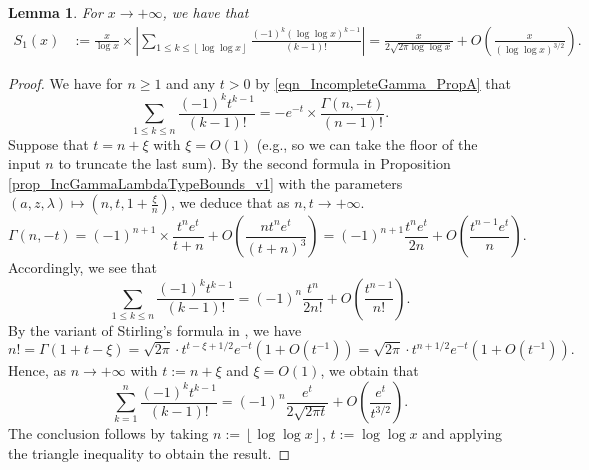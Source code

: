 \documentclass[11pt,reqno,a4letter]{article}
\numberwithin{figure}{section}
\numberwithin{table}{section}
\newcommand{\cf}{\textit{cf.\ }}
\newcommand{\floor}[1]{\left\lfloor #1 \right\rfloor}
\theoremstyle{plain}
\newtheorem{lemma}[theorem]{Lemma}
\numberwithin{theorem}{section}
\theoremstyle{definition}
\begin{document}
\begin{lemma}
\label{lemma_ConvenientIncGammaFuncTypePartialSumAsymptotics_v2}
For $x \rightarrow +\infty$, we have that 
\begin{align*}
S_1(x) & := \frac{x}{\log x} \times \left\lvert \sum_{1 \leq k \leq \floor{\log\log x}} 
     \frac{(-1)^k (\log\log x)^{k-1}}{(k-1)!} \right\rvert 
     = \frac{x}{2\sqrt{2\pi \log\log x}} + O\left(\frac{x}{(\log\log x)^{3/2}}\right). 
\end{align*}
\end{lemma}
\begin{proof}
We have for $n \geq 1$ and any $t > 0$ by 
\eqref{eqn_IncompleteGamma_PropA} that 
\[
\sum_{1 \leq k \leq n} \frac{(-1)^k t^{k-1}}{(k-1)!} = -e^{-t} \times 
     \frac{\Gamma(n, -t)}{(n-1)!}. 
\]
Suppose that $t = n + \xi$ with $\xi = O(1)$ (e.g., so we can take the floor of the input $n$ to 
truncate the last sum). By the second formula 
in Proposition \ref{prop_IncGammaLambdaTypeBounds_v1} 
with the parameters $(a, z, \lambda) \mapsto \left(n, t, 1 + \frac{\xi}{n}\right)$, 
we deduce that as $n,t \rightarrow +\infty$. 
\begin{equation}
\label{eqn_ProofTag_lemma_ConvenientIncGammaFuncTypePartialSumAsymptotics_v2}
\Gamma(n, -t) = (-1)^{n+1} \times \frac{t^n e^{t}}{t+n} + 
     O\left(\frac{n t^n e^{t}}{(t+n)^3}\right) = 
     (-1)^{n+1} \frac{t^n e^t}{2n} + O\left(\frac{t^{n-1} e^t}{n}\right). 
\end{equation}
Accordingly, we see that 
\[
\sum_{1 \leq k \leq n} \frac{(-1)^k t^{k-1}}{(k-1)!} = 
     (-1)^{n} \frac{t^n}{2n!} + O\left(\frac{t^{n-1}}{n!}\right). 
\]
By the variant of Stirling's formula in \cite[\cf Eq.\ (5.11.8)]{NISTHB}, we have 
\[
n! = \Gamma(1 + t - \xi) = \sqrt{2\pi} \cdot t^{t-\xi+1/2} e^{-t} \left(1 + O(t^{-1})\right) = 
     \sqrt{2\pi} \cdot t^{n+1/2} e^{-t} \left(1 + O(t^{-1})\right). 
\]
Hence, as $n \rightarrow +\infty$ with $t := n + \xi$ and $\xi = O(1)$, we obtain that 
\[
\sum_{k=1}^{n} \frac{(-1)^k t^{k-1}}{(k-1)!} = (-1)^n \frac{e^t}{2 \sqrt{2\pi t}} + 
     O\left(\frac{e^t}{t^{3/2}}\right). 
\]
The conclusion follows by taking $n := \floor{\log\log x}$, 
$t := \log\log x$ and applying the triangle inequality 
to obtain the result. 
\end{proof}
\end{document}
